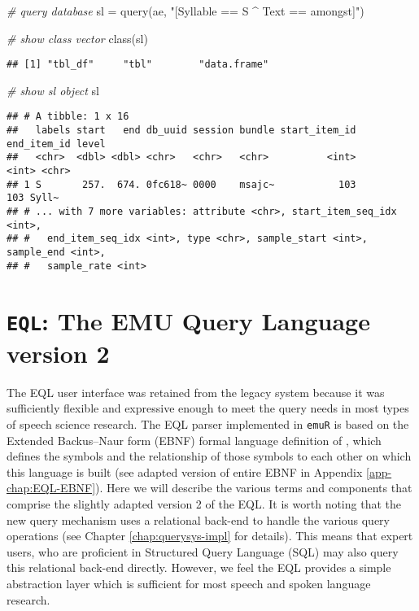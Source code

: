 \documentclass[
]{book}
\newenvironment{Shaded}{\begin{snugshade}}{\end{snugshade}}
\newcommand{\CommentTok}[1]{\textcolor[rgb]{0.56,0.35,0.01}{\textit{#1}}}
\newcommand{\FunctionTok}[1]{\textcolor[rgb]{0.00,0.00,0.00}{#1}}
\newcommand{\NormalTok}[1]{#1}
\newcommand{\OtherTok}[1]{\textcolor[rgb]{0.56,0.35,0.01}{#1}}
\newcommand{\StringTok}[1]{\textcolor[rgb]{0.31,0.60,0.02}{#1}}
\begin{document}
\begin{Shaded}
\begin{Highlighting}[]
\CommentTok{\# query database}
\NormalTok{sl }\OtherTok{=} \FunctionTok{query}\NormalTok{(ae, }\StringTok{"[Syllable == S \^{} Text == amongst]"}\NormalTok{)}

\CommentTok{\# show class vector}
\FunctionTok{class}\NormalTok{(sl)}
\end{Highlighting}
\end{Shaded}

\begin{verbatim}
## [1] "tbl_df"     "tbl"        "data.frame"
\end{verbatim}

\begin{Shaded}
\begin{Highlighting}[]
\CommentTok{\# show sl object}
\NormalTok{sl}
\end{Highlighting}
\end{Shaded}

\begin{verbatim}
## # A tibble: 1 x 16
##   labels start   end db_uuid session bundle start_item_id end_item_id level
##   <chr>  <dbl> <dbl> <chr>   <chr>   <chr>          <int>       <int> <chr>
## 1 S       257.  674. 0fc618~ 0000    msajc~           103         103 Syll~
## # ... with 7 more variables: attribute <chr>, start_item_seq_idx <int>,
## #   end_item_seq_idx <int>, type <chr>, sample_start <int>, sample_end <int>,
## #   sample_rate <int>
\end{verbatim}

\hypertarget{eql-the-emu-query-language-version-2}{%
\section{\texorpdfstring{\texttt{EQL}: The EMU Query Language version 2}{EQL: The EMU Query Language version 2}}\label{eql-the-emu-query-language-version-2}}

The EQL user interface was retained from the legacy system because it was sufficiently flexible and expressive enough to meet the query needs in most types of speech science research. The EQL parser implemented in \texttt{emuR} is based on the Extended Backus--Naur form (EBNF) \citep{garshol:2003a} formal language definition of \citet{john:2012a}, which defines the symbols and the relationship of those symbols to each other on which this language is built (see adapted version of entire EBNF in Appendix \ref{app-chap:EQL-EBNF}). Here we will describe the various terms and components that comprise the slightly adapted version 2 of the EQL. It is worth noting that the new query mechanism uses a relational back-end to handle the various query operations (see Chapter \ref{chap:querysys-impl} for details). This means that expert users, who are proficient in Structured Query Language (SQL) may also query this relational back-end directly. However, we feel the EQL provides a simple abstraction layer which is sufficient for most speech and spoken language research.
\end{document}
